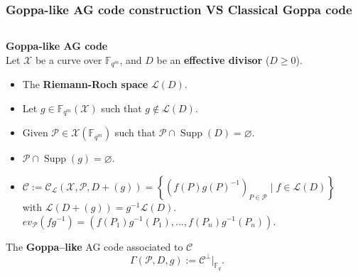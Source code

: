 \documentclass[
10pt, %
%
aspectratio=169, %
]{beamer}
\theoremstyle{plain}%
\theoremstyle{definition}
\theoremstyle{remark}
\newcommand{\calP}{\mathcal{P}}
\newcommand{\calL}{\mathcal{L}}
\newcommand{\calC}{\mathcal{C}}
\newcommand{\calX}{\mathcal{X}}
\newcommand{\fqm}{\mathbb{F}_{q^m}}
\newcommand{\fq}{\mathbb{F}_{q}}
\newcommand{\set}[1]{\left\{#1\right\}}
\newcommand{\Supp}{\operatorname{Supp}}
\begin{document}
\begin{frame}
	\frametitle{Goppa-like AG code construction VS Classical Goppa code}
\begin{columns}[c]
	\hspace{-30pt}
	\begin{column}{0.7\textwidth}
		\textbf{Goppa-like AG code}\\
		Let $\calX$ be a curve over $\fqm$, and  $D$ be an \textbf{effective divisor} ($D \geq 0$).
		\begin{itemize}
		\item The \textbf{Riemann-Roch space} $\calL(D)$.
		\item Let $g \in \fqm(\calX)$ such that $g \notin \calL(D)$. 
		\item Given $\calP \in \calX(\fqm)$ such that $\calP \cap \Supp(D) = \varnothing$.
		\item  $\calP \cap \Supp(g) = \varnothing$.
		\item $\calC := \calC_{\calL}(\calX,\calP,D+(g))=\set{\left(f(P)g(P)^{-1}\right)_{P \in \calP} \mid f \in \calL(D)}$ with $\calL(D+(g)) = g^{-1}\calL(D)$.
		\textcolor{ballblue}{\textrightarrow $ev_{\calP}(fg^{-1})=\left( f(P_1)g^{-1}(P_1),\dots,f(P_n)g^{-1}(P_n) \right)$}.
	\end{itemize}
		
		\begin{block}{The \textbf{Goppa--like} AG code associated to $\calC$}
		$$ \Gamma(\calP,D,g) := \calC^{\perp}|_{\fq}.$$
		\end{block}
	\end{column}
	\hspace{-30pt}
	\vrule{}
	\begin{column}{0.3\textwidth}
		

\end{column}
\end{columns}
\end{frame}
\end{document}

